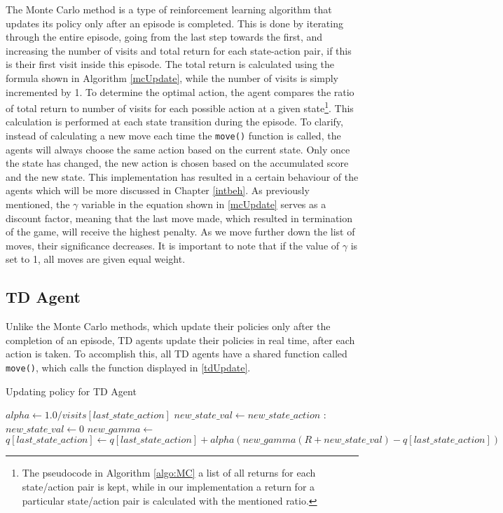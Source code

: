 The Monte Carlo method is a type of reinforcement learning algorithm that updates its policy only after an episode is completed. This is done by iterating through the entire episode, going from the last step towards the first, and increasing the number of visits and total return for each state-action pair, if this is their first visit inside this episode. The total return is calculated using the formula shown in Algorithm \ref{mcUpdate}, while the number of visits is simply incremented by 1. To determine the optimal action, the agent compares the ratio of total return to number of visits for each possible action at a given state\footnote{The pseudocode in Algorithm \ref{algo:MC} a list of all returns for each state/action pair is kept, while in our implementation a return for a particular state/action pair is calculated with the mentioned ratio.}. This calculation is performed at each state transition during the episode. To clarify, instead of calculating a new move each time the \texttt{move()} function is called, the agents will always choose the same action based on the current state. Only once the state has changed, the new action is chosen based on the accumulated score and the new state. This implementation has resulted in a certain behaviour of the agents which will be more discussed in Chapter \ref{intbeh}.
As previously mentioned, the $\gamma$ variable in the equation shown in \ref{mcUpdate} serves as a discount factor, meaning that the last move made, which resulted in termination of the game, will receive the highest penalty. As we move further down the list of moves, their significance decreases. It is important to note that if the value of $\gamma$ is set to 1, all moves are given equal weight. 

\subsection{TD Agent}	
Unlike the Monte Carlo methods, which update their policies only after the completion of an episode, TD agents update their policies in real time, after each action is taken. To accomplish this, all TD agents have a shared function called \texttt{move()}, which calls the function displayed in \ref{tdUpdate}. 

\begin{algorithm}
\caption{Updating policy for TD Agent}\label{tdUpdate}
\begin{algorithmic}[1]
\State $ alpha \gets 1.0 / visits[last\_state\_action]$
\State $new\_state\_val \gets new\_state\_action$
:
\State $new\_state\_val \gets0$
\EndIf
\State $new\_gamma \gets $
\State $q[last\_state\_action] \gets q[last\_state\_action] + alpha(new\_gamma(R + new\_state\_val) - q[last\_state\_action])$
\end{algorithmic}
\end{algorithm}


